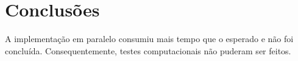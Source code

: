 \section{Conclusões}
A implementação em paralelo consumiu mais tempo que o esperado e não foi
concluída. Consequentemente, testes computacionais não puderam ser feitos.
